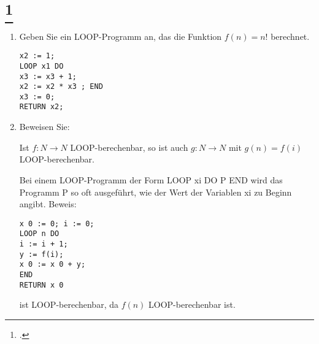 \documentclass{lehramt-informatik-aufgabe}
\begin{document}
\section{
\index{}
\footcite[Aufgabe 1]{theo:ab:4}}

\begin{enumerate}

%

\item Geben Sie ein LOOP-Programm an, das die Funktion $f(n) = n!$
berechnet.

\begin{liAntwort}
\begin{verbatim}
x2 := 1;
LOOP x1 DO
x3 := x3 + 1;
x2 := x2 * x3 ; END
x3 := 0;
RETURN x2;
\end{verbatim}
\end{liAntwort}


\item

Beweisen Sie:

Ist $f : N \rightarrow N$ LOOP-berechenbar, so ist auch
$g : N \rightarrow N$ mit $g(n) = f (i)$
LOOP-berechenbar.

\begin{liAntwort}
Bei einem LOOP-Programm der Form LOOP xi DO P END wird das Programm P so
oft ausgeführt, wie der Wert der Variablen xi zu Beginn angibt. Beweis:

\begin{verbatim}
x 0 := 0; i := 0;
LOOP n DO
i := i + 1;
y := f(i);
x 0 := x 0 + y;
END
RETURN x 0
\end{verbatim}

ist LOOP-berechenbar, da $f (n)$ LOOP-berechenbar ist.
\end{liAntwort}

\end{enumerate}
\end{document}
